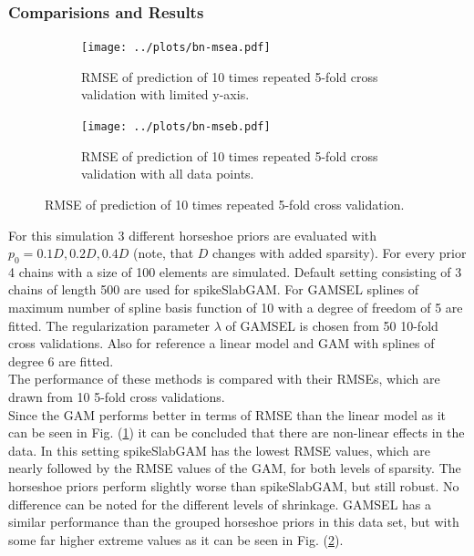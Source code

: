 \documentclass[12pt,letterpaper]{article}
\numberwithin{equation}{subsection}
\begin{document}
\subsubsection{Comparisions and Results}
\label{sec:bncs}
\begin{figure}[hbt!]
 \centering
\begin{subfigure}[b]{0.49\textwidth}
 \texttt{[image: ../plots/bn-msea.pdf]}
\caption {RMSE of prediction of 10 times repeated 5-fold cross validation with limited y-axis.}
 \label{fig:bn-msea}
\end{subfigure}\hfill
\begin{subfigure}[b]{0.49\textwidth}
 \texttt{[image: ../plots/bn-mseb.pdf]}
\caption {RMSE of prediction of 10 times repeated 5-fold cross validation with all data points.}
 \label{fig:bn-mseb}
 \end{subfigure}
 \caption[RMSE of prediction (Boston housing)]{RMSE of prediction of 10 times repeated 5-fold cross validation.}
 \label{fig:bn-mse}
\end{figure}
For this simulation 3 different horseshoe priors are evaluated with $p_0 = 0.1D, 0.2D, 0.4D$ (note, that $D$ changes with added sparsity).  For every prior 4 chains with a size of 100 elements are simulated. Default setting consisting of 3 chains of length 500 are used for spikeSlabGAM. For GAMSEL splines of maximum number of spline basis function of 10 with a degree of freedom of 5 are fitted. The regularization parameter $\lambda$ of GAMSEL is chosen from 50 10-fold cross validations. Also for reference a linear model and GAM with splines of degree 6 are fitted.  \\
The performance of these methods is compared with their RMSEs, which are drawn from 10 5-fold cross validations. \\
Since the GAM performs better in terms of RMSE than the linear model as it can be seen in Fig. (\ref{fig:bn-msea}) it can be concluded that there are non-linear effects in the data. In this setting spikeSlabGAM has the lowest RMSE values, which are nearly followed by the RMSE values of the GAM, for both levels of sparsity. The horseshoe priors perform slightly worse than spikeSlabGAM, but still robust. No difference can be noted for the different levels of shrinkage. GAMSEL has a similar performance than the grouped horseshoe priors in this data set, but with some far higher extreme values as it can be seen in Fig. (\ref{fig:bn-mseb}).
\FloatBarrier
\end{document}
